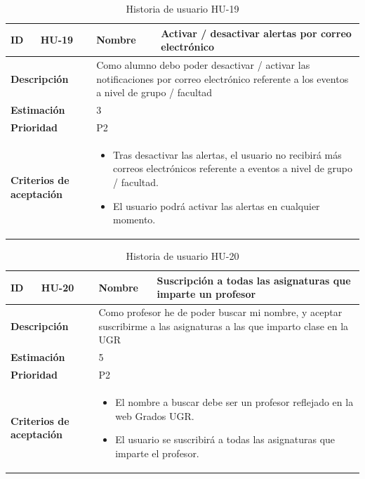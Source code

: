 \begin{table}[H]
    \centering
    \begin{tabular}{|p{2cm}|p{4cm}|p{2cm}|p{4cm}|}
        \hline
        \textbf{ID} & HU-19 & \textbf{Nombre} & Activar / desactivar alertas por correo electrónico \\
        \hline
        \multicolumn{2}{|p{6cm}|}{\textbf{Descripción}} & \multicolumn{2}{p{6cm}|}{Como alumno debo poder desactivar / activar las notificaciones por correo electrónico referente a los eventos a nivel de grupo / facultad} \\
        \hline
        \multicolumn{2}{|p{6cm}|}{\textbf{Estimación}} & \multicolumn{2}{p{6cm}|}{3} \\
        \hline
        \multicolumn{2}{|p{6cm}|}{\textbf{Prioridad}} & \multicolumn{2}{p{6cm}|}{P2} \\
        \hline
        \multicolumn{2}{|p{6cm}|}{\textbf{Criterios de aceptación}} & \multicolumn{2}{p{6cm}|}{
            \begin{itemize}
                \item Tras desactivar las alertas, el usuario no recibirá más correos electrónicos referente a eventos a nivel de grupo / facultad.
                \item El usuario podrá activar las alertas en cualquier momento.
            \end{itemize}
        } \\
        \hline
    \end{tabular}
    \caption{Historia de usuario HU-19}
    \label{tab:hu_19}
\end{table}

\begin{table}[H]
    \centering
    \begin{tabular}{|p{2cm}|p{4cm}|p{2cm}|p{4cm}|}
        \hline
        \textbf{ID} & HU-20 & \textbf{Nombre} & Suscripción a todas las asignaturas que imparte un profesor \\
        \hline
        \multicolumn{2}{|p{6cm}|}{\textbf{Descripción}} & \multicolumn{2}{p{6cm}|}{Como profesor he de poder buscar mi nombre, y aceptar suscribirme a las asignaturas a las que imparto clase en la UGR} \\
        \hline
        \multicolumn{2}{|p{6cm}|}{\textbf{Estimación}} & \multicolumn{2}{p{6cm}|}{5} \\
        \hline
        \multicolumn{2}{|p{6cm}|}{\textbf{Prioridad}} & \multicolumn{2}{p{6cm}|}{P2} \\
        \hline
        \multicolumn{2}{|p{6cm}|}{\textbf{Criterios de aceptación}} & \multicolumn{2}{p{6cm}|}{
            \begin{itemize}
                \item El nombre a buscar debe ser un profesor reflejado en la web Grados UGR.
                \item El usuario se suscribirá a todas las asignaturas que imparte el profesor.
            \end{itemize}
        } \\
        \hline
    \end{tabular}
    \caption{Historia de usuario HU-20}
    \label{tab:hu_20}
\end{table}


